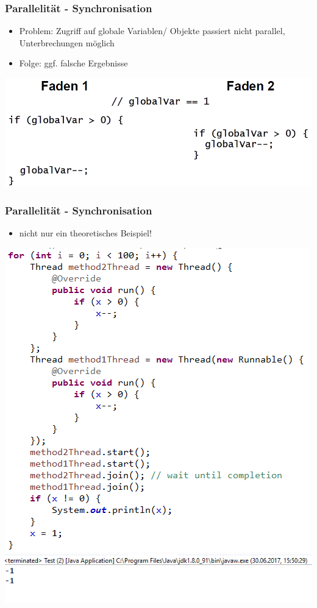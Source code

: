 \documentclass[18pt]{beamer}
\begin{document}
	\begin{frame}
		\frametitle{Parallelität - Synchronisation}
		\begin{itemize}
			\item Problem: Zugriff auf globale Variablen/ Objekte passiert nicht parallel, Unterbrechungen möglich
			\item Folge: ggf. falsche Ergebnisse
		\end{itemize}
		\includegraphics[scale=0.43]{./pics/tut5/par-pro.png}
	\end{frame}

	\begin{frame}
		\frametitle{Parallelität - Synchronisation}
		\begin{itemize}
			\item nicht nur ein theoretisches Beispiel!
		\end{itemize}
		\centering
		\includegraphics[scale=0.43]{./pics/tut5/synch-ex.png} \pause
		\includegraphics[scale=0.43]{./pics/tut5/synch-ex2.png}
	\end{frame}
\end{document}
